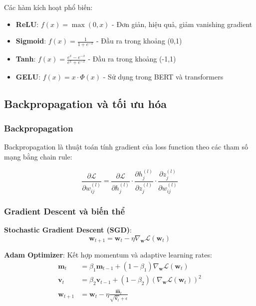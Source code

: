 Các hàm kích hoạt phổ biến:

\begin{itemize}
    \item \textbf{ReLU}: $f(x) = \max(0, x)$ - Đơn giản, hiệu quả, giảm vanishing gradient
    \item \textbf{Sigmoid}: $f(x) = \frac{1}{1 + e^{-x}}$ - Đầu ra trong khoảng (0,1)
    \item \textbf{Tanh}: $f(x) = \frac{e^x - e^{-x}}{e^x + e^{-x}}$ - Đầu ra trong khoảng (-1,1)
    \item \textbf{GELU}: $f(x) = x \cdot \Phi(x)$ - Sử dụng trong BERT và transformers
\end{itemize}

\subsection{Backpropagation và tối ưu hóa}

\subsubsection{Backpropagation}

Backpropagation là thuật toán tính gradient của loss function theo các tham số mạng bằng chain rule:

\begin{equation}
\frac{\partial \mathcal{L}}{\partial w_{ij}^{(l)}} = \frac{\partial \mathcal{L}}{\partial h_j^{(l)}} \cdot \frac{\partial h_j^{(l)}}{\partial z_j^{(l)}} \cdot \frac{\partial z_j^{(l)}}{\partial w_{ij}^{(l)}}
\end{equation}

\subsubsection{Gradient Descent và biến thể}

\textbf{Stochastic Gradient Descent (SGD)}:
\begin{equation}
\mathbf{w}_{t+1} = \mathbf{w}_t - \eta \nabla_{\mathbf{w}} \mathcal{L}(\mathbf{w}_t)
\end{equation}

\textbf{Adam Optimizer}: Kết hợp momentum và adaptive learning rates:
\begin{align}
\mathbf{m}_t &= \beta_1 \mathbf{m}_{t-1} + (1-\beta_1) \nabla_{\mathbf{w}} \mathcal{L}(\mathbf{w}_t) \\
\mathbf{v}_t &= \beta_2 \mathbf{v}_{t-1} + (1-\beta_2) (\nabla_{\mathbf{w}} \mathcal{L}(\mathbf{w}_t))^2 \\
\mathbf{w}_{t+1} &= \mathbf{w}_t - \eta \frac{\hat{\mathbf{m}}_t}{\sqrt{\hat{\mathbf{v}}_t} + \epsilon}
\end{align}

